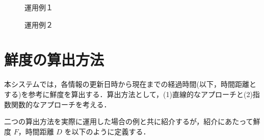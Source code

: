 \begin{figure}[htbp]
  \begin{minipage}{0.5\hsize}
    \begin{center}
    \end{center}
    \caption{運用例１}
  \end{minipage}
  \begin{minipage}{0.5\hsize}
    \begin{center}
    \end{center}
    \caption{運用例２}
  \end{minipage}
\end{figure}

\section{鮮度の算出方法}
\label{sec:imp_calculation}

本システムでは，各情報の更新日時から現在までの経過時間(以下，時間距離とする)を参考に鮮度を算出する．算出方法として，(1)直線的なアプローチと(2)指数関数的なアプローチを考える．

二つの算出方法を実際に運用した場合の例と共に紹介するが，紹介にあたって鮮度 $F$，時間距離 $D$ を以下のように定義する．

